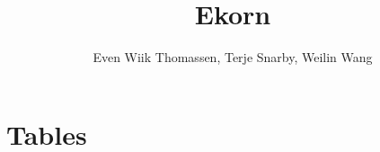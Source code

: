 \documentclass[11pt,a4paper]{article}
\title{Ekorn}
\author{Even Wiik Thomassen, Terje Snarby, Weilin Wang}
\date{\now}
\begin{document}
\section{Tables}

\end{document}
